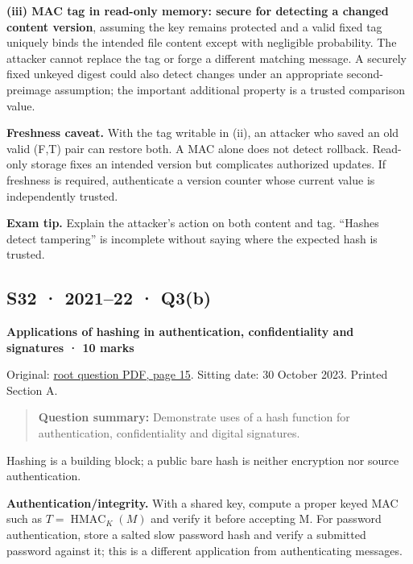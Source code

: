 \documentclass[11pt,a4paper]{article}
\begin{document}
\textbf{(iii) MAC tag in read-only memory: secure for detecting a changed content version},\allowbreak{} assuming the key remains protected and a valid fixed tag uniquely binds the intended file content except with negligible probability. The attacker cannot replace the tag or forge a different matching message. A securely fixed unkeyed digest could also detect changes under an appropriate second-preimage assumption; the important additional property is a trusted comparison value.


\textbf{Freshness caveat.} With the tag writable in (ii),\allowbreak{} an attacker who saved an old valid (F,\allowbreak{}T) pair can restore both. A MAC alone does not detect rollback. Read-only storage fixes an intended version but complicates authorized updates. If freshness is required,\allowbreak{} authenticate a version counter whose current value is independently trusted.



{\color{ForestGreen}\textbf{Exam tip.} Explain the attacker’s action on both content and tag. “Hashes detect tampering” is incomplete without saying where the expected hash is trusted.}




\clearpage
\subsection{S32 · 2021–22 · Q3(b)}\label{s32}

\textbf{Applications of hashing in authentication,\allowbreak{} confidentiality and signatures · 10 marks}


Original: \href{../../CSE405-Security_Merged.pdf\#page=15}{root question PDF,\allowbreak{} page 15}. Sitting date: 30 October 2023. Printed Section A.



\begin{quote}\small

\textbf{Question summary:} Demonstrate uses of a hash function for authentication,\allowbreak{} confidentiality and digital signatures.



\end{quote}

Hashing is a building block; a public bare hash is neither encryption nor source authentication.


\textbf{Authentication/\allowbreak{}integrity.} With a shared key,\allowbreak{} compute a proper keyed MAC such as \(T=\operatorname{HMAC}_K(M)\) and verify it before accepting M. For password authentication,\allowbreak{} store a salted slow password hash and verify a submitted password against it; this is a different application from authenticating messages.
\end{document}
